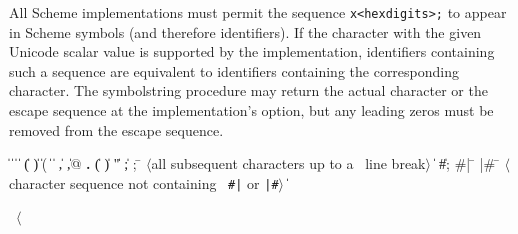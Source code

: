 All Scheme implementations must permit the sequence
{\tt \backwhack{}x<hexdigits>;}
to appear in Scheme symbols (and therefore identifiers). If the character
with the given Unicode scalar value is supported by the implementation,
identifiers containing such a sequence are equivalent to identifiers
containing the corresponding character. The {\cf symbol\coerce{}string}
procedure may return the actual character or the escape sequence at the
implementation's option, but any leading zeros must be removed from the
escape sequence.

\begin{grammar}%
 \:  \|  \| 
\>  \|  \| 
\>  \| ( \| ) \| \sharpsign( \| \singlequote{} \| \backquote{} \| , \| ,@ \| {\bf.}
 \:  \| ( \| ) \| " \| ;
 \: 
 \: 
 \: ; \= $\langle$\rm all subsequent characters up to a
		    \>\ \rm line break$\rangle$
\> \| 
\> \| \#;  
 \: \#| \= 
\>  |\#
 \: \= $\langle$\rm character sequence not containing
\>\ \rm {\tt \#|} or {\tt |\#}$\rangle$
 \:  
 \:  \| 
 \: %
\end{grammar}

\label{extendedalphas}
\label{identifiersyntax}

\hbox{\cf{} \goesto{} $\langle$}



